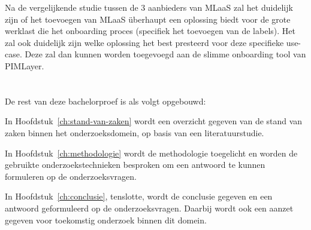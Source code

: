 Na de vergelijkende studie tussen de 3 aanbieders van MLaaS zal het duidelijk zijn of het toevoegen van MLaaS überhaupt een oplossing biedt voor de grote werklast die het onboarding proces (specifiek het toevoegen van de labels). Het zal ook duidelijk zijn welke oplossing het best presteerd voor deze specifieke use-case. Deze zal dan kunnen worden toegevoegd aan de slimme onboarding tool van PIMLayer.

\section{}%
\label{sec:opzet-bachelorproef}


De rest van deze bachelorproef is als volgt opgebouwd:

In Hoofdstuk~\ref{ch:stand-van-zaken} wordt een overzicht gegeven van de stand van zaken binnen het onderzoeksdomein, op basis van een literatuurstudie.

In Hoofdstuk~\ref{ch:methodologie} wordt de methodologie toegelicht en worden de gebruikte onderzoekstechnieken besproken om een antwoord te kunnen formuleren op de onderzoeksvragen.


In Hoofdstuk~\ref{ch:conclusie}, tenslotte, wordt de conclusie gegeven en een antwoord geformuleerd op de onderzoeksvragen. Daarbij wordt ook een aanzet gegeven voor toekomstig onderzoek binnen dit domein.